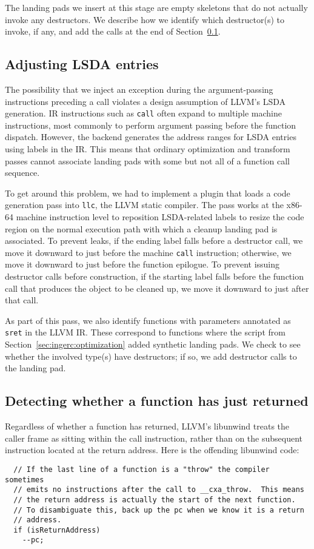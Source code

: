The landing pads we insert at this stage are empty skeletons that do not actually
invoke any destructors.  We describe how we identify which destructor(s) to invoke,
if any, and add the calls at the end of Section~\ref{sec:ingerc:codegen}.


\subsection{Adjusting LSDA entries}
\label{sec:ingerc:codegen}

The possibility that we inject an exception during the argument-passing instructions
preceding a call violates a design assumption of LLVM's LSDA generation.  IR
instructions such as \texttt{call} often expand to multiple machine instructions,
most commonly to perform argument passing before the function dispatch.  However, the
backend generates the address ranges for LSDA entries using labels in the IR.  This
means that ordinary optimization and transform passes cannot associate landing pads
with some but not all of a function call sequence.

To get around this problem, we had to implement a plugin that loads a code generation
pass into \texttt{llc}, the LLVM static compiler.  The pass works at the x86-64
machine instruction level to reposition LSDA-related labels to resize the code region
on the normal execution path with which a cleanup landing pad is associated.  To
prevent leaks, if the ending label falls before a destructor call, we move it downward
to just before the machine \texttt{call} instruction; otherwise, we move it downward
to just before the function epilogue.  To prevent issuing destructor calls before
construction, if the starting label falls before the function call that produces the
object to be cleaned up, we move it downward to just after that call.

As part of this pass, we also identify functions with parameters annotated as
\texttt{sret} in the LLVM IR.  These correspond to functions where the script from
Section~\ref{sec:ingerc:optimization} added synthetic landing pads.  We check to see
whether the involved type(s) have destructors; if so, we add destructor calls to the
landing pad.


\subsection{Detecting whether a function has just returned}
\label{sec:ingerc:return}

Regardless of whether a function has returned, LLVM's libunwind treats the caller
frame as sitting within the call instruction, rather than on the subsequent
instruction located at the return address.  Here is the offending libunwind code:
\begin{lstlisting}
  // If the last line of a function is a "throw" the compiler sometimes
  // emits no instructions after the call to __cxa_throw.  This means
  // the return address is actually the start of the next function.
  // To disambiguate this, back up the pc when we know it is a return
  // address.
  if (isReturnAddress)
    --pc;
\end{lstlisting}

